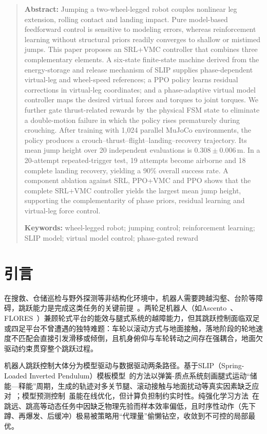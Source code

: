 \documentclass[12pt,a4paper,fontset=fandol]{ctexart}
\numberwithin{equation}{section}
\numberwithin{figure}{section}
\numberwithin{table}{section}
\begin{document}
\begin{quote}
\noindent\textbf{Abstract:} Jumping a two-wheel-legged robot couples nonlinear leg extension, rolling contact and landing impact. Pure model-based feedforward control is sensitive to modeling errors, whereas reinforcement learning without structural priors readily converges to shallow or mistimed jumps. This paper proposes an SRL+VMC controller that combines three complementary elements. A six-state finite-state machine derived from the energy-storage and release mechanism of SLIP supplies phase-dependent virtual-leg and wheel-speed references; a PPO policy learns residual corrections in virtual-leg coordinates; and a phase-adaptive virtual model controller maps the desired virtual forces and torques to joint torques. We further gate thrust-related rewards by the physical FSM state to eliminate a double-motion failure in which the policy rises prematurely during crouching. After training with 1,024 parallel MuJoCo environments, the policy produces a crouch--thrust--flight--landing--recovery trajectory. Its mean jump height over 20 independent evaluations is $0.308\pm0.006$\,m. In a 20-attempt repeated-trigger test, 19 attempts become airborne and 18 complete landing recovery, yielding a 90\% overall success rate. A component ablation against SRL, PPO+VMC and PPO shows that the complete SRL+VMC controller yields the largest mean jump height, supporting the complementarity of phase priors, residual learning and virtual-leg force control.

\par\noindent\textbf{Keywords:} wheel-legged robot; jumping control; reinforcement learning; SLIP model; virtual model control; phase-gated reward
\end{quote}

\section{引言}

在搜救、仓储巡检与野外探测等非结构化环境中，机器人需要跨越沟壑、台阶等障碍，跳跃能力是完成这类任务的关键前提~\cite{mo2020jumping, koh2015jumping}。两轮足机器人（如Ascento~\cite{klemm2020ascento}、FLORES~\cite{song2025flores}）兼顾轮式平台的能效与腿式系统的越障能力，但其跳跃控制面临双足或四足平台不曾遭遇的独特难题：车轮以滚动方式与地面接触，落地阶段的轮地速度不匹配会直接引发滑移或倾倒，且机身俯仰与车轮转动之间存在强耦合，地面欠驱动约束贯穿整个跳跃过程。

机器人跳跃控制大体分为模型驱动与数据驱动两条路径。基于SLIP（Spring-Loaded Inverted Pendulum）模板模型~\cite{full1999templates, piovan2015reachability, piovan2016approximation}的方法以弹簧-质点系统刻画腿式运动“储能—释能”周期，生成的轨迹对多关节腿、滚动接触与地面扰动等真实因素缺乏应对~\cite{wensing2013slip}；模型预测控制~\cite{park2021cheetah, he2024cdm}虽能在线优化，但计算负担制约实时性。纯强化学习方法~\cite{kober2013rl, tao2024multiobjective, bellegarda2024robust}在跳远、跳高等动态任务中因缺乏物理先验而样本效率偏低，且时序性动作（先下蹲、再爆发、后缓冲）极易被策略用“代理量”偷懒钻空，收敛到不可控的局部最优。
\end{document}
